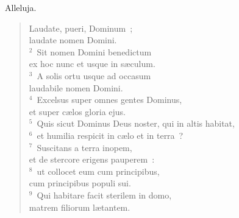 \bchapter
\lettrine[lines=3,image=true,loversize=0.05,lraise=-0.03]{A}{}lleluja. \begin{flushleft}\begin{verse}\vspace{6pt}Laudate, pueri, Dominum~;\\ laudate nomen Domini.\\
${}^{2}$~Sit nomen Domini benedictum\\ ex hoc nunc et usque in s\ae culum.\\
${}^{3}$~A solis ortu usque ad occasum\\ laudabile nomen Domini.\\
${}^{4}$~Excelsus super omnes gentes Dominus,\\ et super c\ae los gloria ejus.\\
${}^{5}$~Quis sicut Dominus Deus noster, qui in altis habitat,\\
${}^{6}$~et humilia respicit in c\ae lo et in terra~?\\
${}^{7}$~Suscitans a terra inopem,\\ et de stercore erigens pauperem~:\\
${}^{8}$~ut collocet eum cum principibus,\\ cum principibus populi sui.\\
${}^{9}$~Qui habitare facit sterilem in domo,\\ matrem filiorum l\ae tantem.\end{verse}\end{flushleft}



